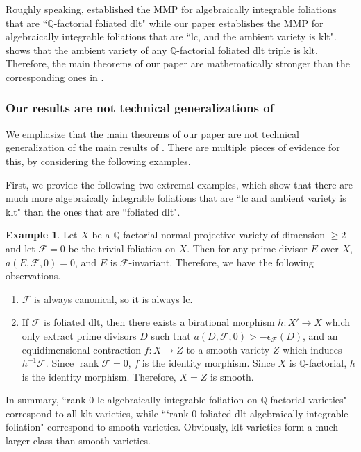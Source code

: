 \documentclass[11pt]{amsart}
\numberwithin{equation}{section}
\newcommand{\Qq}{\mathbb{Q}}
\newcommand{\rk}{\operatorname{rank}}
\newcommand{\Ff}{\mathcal{F}}
\theoremstyle{definition}
\theoremstyle{definition}
\newtheorem{ex}[thm]{Example}
\theoremstyle{definition}
\begin{document}
Roughly speaking, \cite{CHLX23} established the MMP for algebraically integrable foliations that are ``$\Qq$-factorial foliated dlt" while our paper establishes the MMP for algebraically integrable foliations that are ``lc, and the ambient variety is klt". \cite[Theorem 2.1.9]{CHLX23} shows that the ambient variety of any $\Qq$-factorial foliated dlt triple is klt. Therefore, the main theorems of our paper are mathematically stronger than the corresponding ones in \cite{CHLX23}. 

\subsubsection{Our results are not technical generalizations of \texorpdfstring{\cite{CHLX23}}{}} We emphasize that the main theorems of our paper are not technical generalization of the main results of \cite{CHLX23}. There are multiple pieces of evidence for this, by considering the following examples.

First, we provide the following two extremal examples, which show that there are much more algebraically integrable foliations that are ``lc and ambient variety is klt" than the ones that are ``foliated dlt".


\begin{ex}\label{ex: bad singularity if not assuming klt}
Let $X$ be a $\Qq$-factorial normal projective variety of dimension $\geq 2$ and let $\Ff=0$ be the trivial foliation on $X$. Then for any prime divisor $E$ over $X$, $a(E,\Ff,0)=0$, and $E$ is $\Ff$-invariant. Therefore, we have the following observations.
    \begin{enumerate}
        \item $\Ff$ is always canonical, so it is always lc.
        \item If $\Ff$ is foliated dlt, then there exists a birational morphism $h: X'\rightarrow X$ which only extract prime divisors $D$ such that $a(D,\Ff,0)>-\epsilon_{\Ff}(D)$, and an equidimensional contraction $f: X\rightarrow Z$ to a smooth variety $Z$ which induces $h^{-1}\Ff$. Since $\rk\Ff=0$, $f$ is the identity morphism. Since $X$ is $\Qq$-factorial, $h$ is the identity morphism. Therefore, $X=Z$ is smooth.
    \end{enumerate}
In summary, ``rank $0$ lc algebraically integrable foliation on $\Qq$-factorial varieties" correspond to all klt varieties, while ```rank $0$ foliated dlt algebraically integrable foliation" correspond to smooth varieties. Obviously, klt varieties form a much larger class than smooth varieties.
\end{ex}
\end{document}
